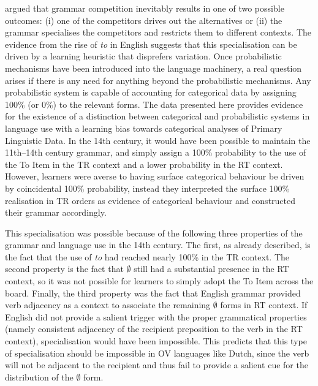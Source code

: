 	\cite{Wallenberg.2013} argued that grammar competition inevitably results in one of two possible outcomes: (i) one of the competitors drives out the alternatives or (ii) the grammar specialises the competitors and restricts them to different contexts. The evidence from the rise of \textit{to} in English suggests that this specialisation can be driven by a learning heuristic that disprefers variation. Once probabilistic mechanisms have been introduced into the language machinery, a real question arises if there is any need for anything beyond the probabilistic mechanisms. Any probabilistic system is capable of accounting for categorical data by assigning 100\% (or 0\%) to the relevant forms. The data presented here provides evidence for the existence of a distinction between categorical and probabilistic systems in language use with a learning bias towards categorical analyses of Primary Linguistic Data. In the 14th century, it would have been possible to maintain the 11th--14th century grammar, and simply assign a 100\% probability to the use of the To Item in the TR context and a lower probability in the RT context. However, learners were averse to having surface categorical behaviour be driven by coincidental 100\% probability, instead they interpreted the surface 100\% realisation in TR orders as evidence of categorical behaviour and constructed their grammar accordingly.

	This specialisation was possible because of the following three properties of the grammar and language use in the 14th century. The first, as already described, is the fact that the use of \textit{to} had reached nearly 100\% in the TR context. The second property is the fact that $\emptyset$ still had a substantial presence in the RT context, so it was not possible for learners to simply adopt the To Item across the board. Finally, the third property was the fact that English grammar provided verb adjacency as a context to associate the remaining $\emptyset$ forms in RT context. If English did not provide a salient trigger with the proper grammatical properties (namely consistent adjacency of the recipient preposition to the verb in the RT context), specialisation would have been impossible. This predicts that this type of specialisation should be impossible in OV languages like Dutch, since the verb will not be adjacent to the recipient and thus fail to provide a salient cue for the distribution of the $\emptyset$ form. 

